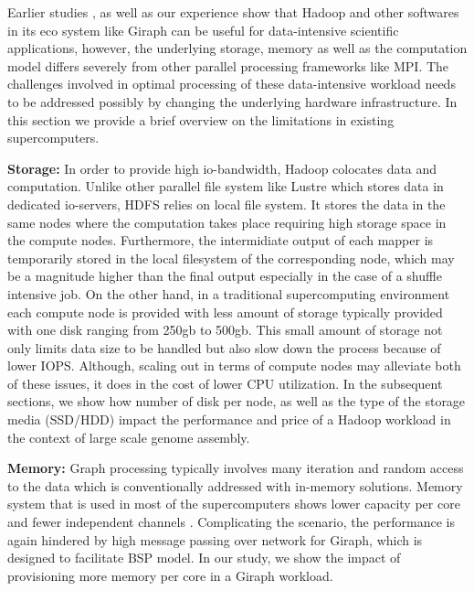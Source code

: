 Earlier studies \cite{schadoop:fadika}, \cite{schadoop:matsunaga} as well as our experience show that Hadoop and other softwares in its eco system like Giraph can be useful for data-intensive scientific applications, however, the underlying storage, memory as well as the computation model differs severely from other parallel processing frameworks like MPI. 
The challenges involved in optimal processing of these data-intensive workload needs to be addressed possibly by changing the underlying hardware infrastructure.
In this section we provide a brief overview on the limitations in existing supercomputers.

\textbf{Storage:} 
In order to provide high io-bandwidth, Hadoop colocates data and computation. 
Unlike other parallel file system like Lustre which stores data in dedicated io-servers, HDFS relies on local file system.
It stores the data in the same nodes where the computation takes place requiring high storage space in the compute nodes. 
Furthermore, the intermidiate output of each mapper is temporarily stored in the local filesystem of the corresponding node, which may be a magnitude higher than the final output especially in the case of a shuffle intensive job.
On the other hand, in a traditional supercomputing environment each compute node is provided with less amount of storage typically provided with one disk ranging from 250gb to 500gb.
This small amount of storage not only limits data size to be handled but also slow down the process because of lower IOPS.
Although, scaling out in terms of compute nodes may alleviate both of these issues, it does in the cost of lower CPU utilization.
In the subsequent sections, we show how number of disk per node, as well as the type of the storage media (SSD/HDD) impact the performance and price of a Hadoop workload in the context of large scale genome assembly. 

\textbf{Memory:}
Graph processing typically involves many iteration and random access to the data which is conventionally addressed with in-memory solutions. 
Memory system that is used in most of the supercomputers shows lower capacity per core and fewer independent channels \cite{bm:graph500}.
Complicating the scenario, the performance is again hindered by high message passing over network for Giraph, which is designed to facilitate BSP model.
In our study, we show the impact of provisioning more memory per core in a Giraph workload.

